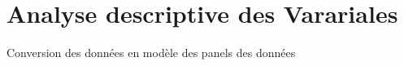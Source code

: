 \documentclass[
]{book}
\newenvironment{Shaded}{\begin{snugshade}}{\end{snugshade}}
\newcommand{\FunctionTok}[1]{\textcolor[rgb]{0.00,0.00,0.00}{#1}}
\newcommand{\NormalTok}[1]{#1}
\newcommand{\OtherTok}[1]{\textcolor[rgb]{0.56,0.35,0.01}{#1}}
\newcommand{\SpecialCharTok}[1]{\textcolor[rgb]{0.00,0.00,0.00}{#1}}
\begin{document}
\hypertarget{analyse-descriptive-des-varariales}{%
\section{Analyse descriptive des Varariales}\label{analyse-descriptive-des-varariales}}

Conversion des données en modèle des panels des données

\begin{Shaded}
\end{Shaded}
\end{document}
